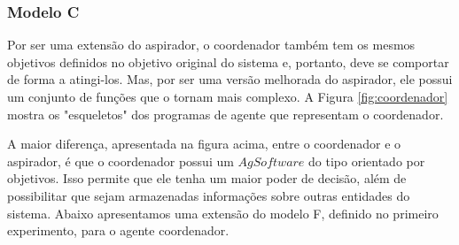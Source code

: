 \subsubsection{Modelo C}

Por ser uma extensão do aspirador, o coordenador também tem os mesmos objetivos definidos no objetivo original do sistema e, portanto, deve se comportar de forma a atingi-los. Mas, por ser uma versão melhorada do aspirador, ele possui um conjunto de funções que o tornam mais complexo. A Figura \ref{fig:coordenador} mostra os "esqueletos" dos programas de agente que representam o coordenador. 

\begin{figure}[h!]
    \centering
\end{figure}

A maior diferença, apresentada na figura acima, entre o coordenador e o aspirador, é que o coordenador possui um $AgSoftware$ do tipo orientado por objetivos. Isso permite que ele tenha um maior poder de decisão, além de possibilitar que sejam armazenadas informações sobre outras entidades do sistema. Abaixo apresentamos uma extensão do modelo F, definido no primeiro experimento, para o agente coordenador.

